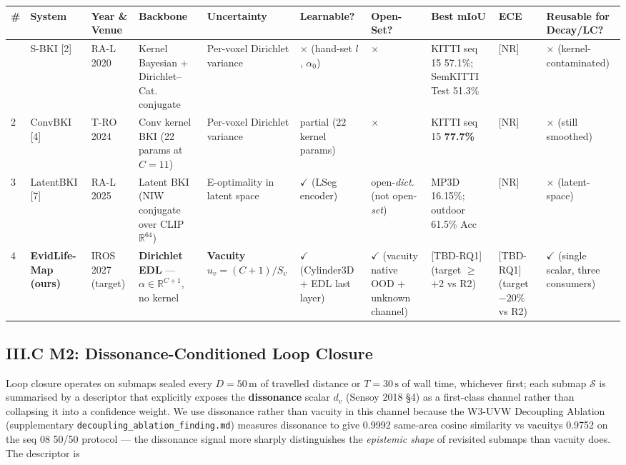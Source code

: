 \documentclass[
]{article}
\newcounter{none} %
\begin{document}
{\def\LTcaptype{none} %
\begin{longtable}[]{@{}llllllllll@{}}
\toprule\noalign{}
\# & System & Year \& Venue & Backbone & Uncertainty & Learnable? &
Open-Set? & Best mIoU & ECE & Reusable for Decay/LC? \\
\midrule\noalign{}
\endhead
\bottomrule\noalign{}
\endlastfoot
1 & S-BKI {[}2{]} & RA-L 2020 & Kernel Bayesian + Dirichlet--Cat.
conjugate & Per-voxel Dirichlet variance & \(\times\) (hand-set \(l\),
\(\alpha_0\)) & \(\times\) & KITTI seq 15 57.1\%; SemKITTI Test 51.3\% &
{[}NR{]} & \(\times\) (kernel-contaminated) \\
2 & ConvBKI {[}4{]} & T-RO 2024 & Conv kernel BKI (22 params at
\(C{=}11\)) & Per-voxel Dirichlet variance & partial (22 kernel params)
& \(\times\) & KITTI seq 15 \textbf{77.7\%} & {[}NR{]} & \(\times\)
(still smoothed) \\
3 & LatentBKI {[}7{]} & RA-L 2025 & Latent BKI (NIW conjugate over CLIP
\(\mathbb{R}^{64}\)) & E-optimality in latent space & \(\checkmark\)
(LSeg encoder) & open-\emph{dict.} (not open-\emph{set}) & MP3D 16.15\%;
outdoor 61.5\% Acc & {[}NR{]} & \(\times\) (latent-space) \\
4 & \textbf{EvidLife-Map (ours)} & IROS 2027 (target) &
\textbf{Dirichlet EDL} --- \(\alpha \in \mathbb{R}^{C+1}\), no kernel &
\textbf{Vacuity} \(u_v = (C+1)/S_v\) & \(\checkmark\) (Cylinder3D + EDL
last layer) & \(\checkmark\) (vacuity native OOD + unknown channel) &
{[}TBD-RQ1{]} (target \(\ge\) +2 vs R2) & {[}TBD-RQ1{]} (target
\(-20\%\) vs R2) & \(\checkmark\) (single scalar, three consumers) \\
\end{longtable}
}

\subsection{III.C M2: Dissonance-Conditioned Loop
Closure}\label{iiic-m2-dissonance-conditioned-loop-closure}

Loop closure operates on submaps sealed every \(D = 50\,\text{m}\) of
travelled distance or \(T = 30\,\text{s}\) of wall time, whichever
first; each submap \(\mathcal{S}\) is summarised by a descriptor that
explicitly exposes the \textbf{dissonance} scalar \(d_v\) (Sensoy 2018
§4) as a first-class channel rather than collapsing it into a confidence
weight. We use dissonance rather than vacuity in this channel because
the W3-UVW Decoupling Ablation (supplementary
\texttt{decoupling\_ablation\_finding.md}) measures dissonance to give
0.9992 same-area cosine similarity vs vacuity\textquotesingle s 0.9752
on the seq 08 50/50 protocol --- the dissonance signal more sharply
distinguishes the \emph{epistemic shape} of revisited submaps than
vacuity does. The descriptor is
\end{document}
